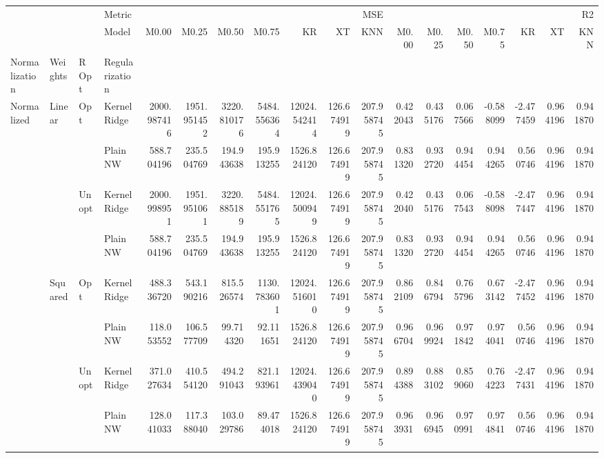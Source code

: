\begin{tabular}{llllrrrrrrrrrrrrrr}
\toprule
 &  &  & Metric & \multicolumn{7}{r}{MSE} & \multicolumn{7}{r}{R2} \\
 &  &  & Model & M0.00 & M0.25 & M0.50 & M0.75 & KR & XT & KNN & M0.00 & M0.25 & M0.50 & M0.75 & KR & XT & KNN \\
Normalization & Weights & R Opt & Regularization &  &  &  &  &  &  &  &  &  &  &  &  &  &  \\
\midrule
\multirow[t]{8}{*}{Normalized} & \multirow[t]{4}{*}{Linear} & \multirow[t]{2}{*}{Opt} & KernelRidge & 2000.987416 & 1951.951452 & 3220.810176 & 5484.556364 & 12024.542414 & 126.674919 & 207.958745 & 0.422043 & 0.435176 & 0.067566 & -0.588099 & -2.477459 & 0.964196 & 0.941870 \\
 &  &  & Plain NW & 588.704196 & 235.504769 & 194.943638 & 195.913255 & 1526.824120 & 126.674919 & 207.958745 & 0.831320 & 0.932720 & 0.944454 & 0.944265 & 0.560746 & 0.964196 & 0.941870 \\
\cline{3-18}
 &  & \multirow[t]{2}{*}{Unopt} & KernelRidge & 2000.998951 & 1951.951061 & 3220.885189 & 5484.551765 & 12024.500949 & 126.674919 & 207.958745 & 0.422040 & 0.435176 & 0.067543 & -0.588098 & -2.477447 & 0.964196 & 0.941870 \\
 &  &  & Plain NW & 588.704196 & 235.504769 & 194.943638 & 195.913255 & 1526.824120 & 126.674919 & 207.958745 & 0.831320 & 0.932720 & 0.944454 & 0.944265 & 0.560746 & 0.964196 & 0.941870 \\
\cline{2-18} \cline{3-18}
 & \multirow[t]{4}{*}{Squared} & \multirow[t]{2}{*}{Opt} & KernelRidge & 488.336720 & 543.190216 & 815.526574 & 1130.783601 & 12024.516010 & 126.674919 & 207.958745 & 0.862109 & 0.846794 & 0.765796 & 0.673142 & -2.477452 & 0.964196 & 0.941870 \\
 &  &  & Plain NW & 118.053552 & 106.577709 & 99.714320 & 92.111651 & 1526.824120 & 126.674919 & 207.958745 & 0.966704 & 0.969924 & 0.971842 & 0.974041 & 0.560746 & 0.964196 & 0.941870 \\
\cline{3-18}
 &  & \multirow[t]{2}{*}{Unopt} & KernelRidge & 371.027634 & 410.554120 & 494.291043 & 821.193961 & 12024.439040 & 126.674919 & 207.958745 & 0.894388 & 0.883102 & 0.859060 & 0.764223 & -2.477431 & 0.964196 & 0.941870 \\
 &  &  & Plain NW & 128.041033 & 117.388040 & 103.029786 & 89.474018 & 1526.824120 & 126.674919 & 207.958745 & 0.963931 & 0.966945 & 0.970991 & 0.974841 & 0.560746 & 0.964196 & 0.941870 \\
\cline{1-18} \cline{2-18} \cline{3-18}
\bottomrule
\end{tabular}
